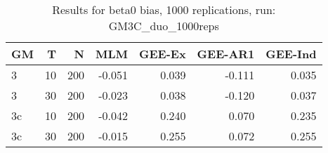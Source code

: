 \begin{table}[ht]
\centering
\begin{tabular}{lrrrrrr}
  \hline
GM & T & N & MLM & GEE-Ex & GEE-AR1 & GEE-Ind \\ 
  \hline
3 & 10 & 200 & -0.051 & 0.039 & -0.111 & 0.035 \\ 
  3 & 30 & 200 & -0.023 & 0.038 & -0.120 & 0.037 \\ 
  3c & 10 & 200 & -0.042 & 0.240 & 0.070 & 0.235 \\ 
  3c & 30 & 200 & -0.015 & 0.255 & 0.072 & 0.255 \\ 
   \hline
\end{tabular}
\caption{Results for beta0 bias, 1000 replications, run: GM3C_duo_1000reps} 
\label{tab:beta0_bias}
\end{table}
